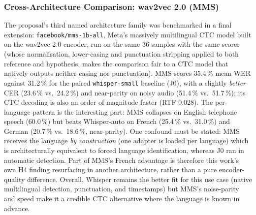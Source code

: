\documentclass[12pt]{report}
\begin{document}
\subsubsection{Cross-Architecture Comparison: wav2vec 2.0 (MMS)}
The proposal's third named architecture family was benchmarked in a final extension: \texttt{facebook/mms-1b-all}, Meta's massively multilingual CTC model built on the wav2vec 2.0 encoder, run on the same 36 samples with the same scorer (whose normalisation, lower-casing and punctuation stripping applied to both reference and hypothesis, makes the comparison fair to a CTC model that natively outputs neither casing nor punctuation). MMS scores 35.4\,\% mean WER against 31.2\,\% for the paired \texttt{whisper-small} baseline (J0), with a slightly \emph{better} CER (23.6\,\% vs.\ 24.2\,\%) and near-parity on noisy audio (51.4\,\% vs.\ 51.7\,\%); its CTC decoding is also an order of magnitude faster (RTF 0.028). The per-language pattern is the interesting part: MMS collapses on English telephone speech (60.0\,\%) but beats Whisper-auto on French (25.4\,\% vs.\ 31.0\,\%) and German (20.7\,\% vs.\ 18.6\,\%, near-parity). One confound must be stated: MMS receives the language \emph{by construction} (one adapter is loaded per language) which is architecturally equivalent to forced language identification, whereas J0 ran in automatic detection. Part of MMS's French advantage is therefore this work's own H4 finding resurfacing in another architecture, rather than a pure encoder-quality difference. Overall, Whisper remains the better fit for this use case (native multilingual detection, punctuation, and timestamps) but MMS's noise-parity and speed make it a credible CTC alternative where the language is known in advance.
\end{document}
